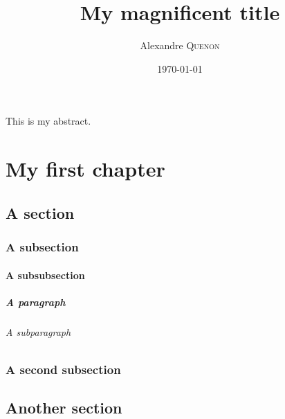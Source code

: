 \documentclass[%
	papersize=a4,%
	pagelayout=default,%
	fontname=latinmodern,%
	fontsize=11pt,%
	twoside,%
	final,%
	faculty=fpms%
]{umons-Thesis}%
\author{Alexandre \textsc{Quenon}}
\date{\today}
\title{My magnificent title}
\begin{document}
	
\umonsThesisTitlePage


\frontmatter

	\begin{umonsThesisAbstract}
		This is my abstract.
	\end{umonsThesisAbstract}

	
	\tableofcontents*
	

\mainmatter

	\chapter{My first chapter}
	
		\lipsum[1-3]
		
		
		\section{A section}
		
			\lipsum[4-6]
			
			
			\subsection{A subsection}
			
				\lipsum[7-9]
				
				\subsubsection{A subsubsection}
				
					\lipsum[10]
					
					\paragraph{A paragraph}
					
						\lipsum[11]
						
						\subparagraph{A subparagraph}
						
							\blindtext
			
			\subsection{A second subsection}
			
				\lipsum[13-15]
		
		
		\section{Another section}
		
			\lipsum[4-6]
			
\end{document}
